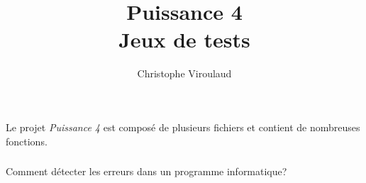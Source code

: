 \documentclass[svgnames,11pt]{beamer}
\author[]{Christophe Viroulaud}
\title{Puissance 4\\Jeux de tests}
\date{\framebox{\textbf{Lang 09}}}
\institute{Première - NSI}
\begin{document}
\begin{frame}
    \titlepage
\end{frame}
\begin{frame}
    \frametitle{}

    \begin{center}
        Le projet \emph{Puissance 4} est composé de plusieurs fichiers et contient de nombreuses fonctions.
    \end{center}

\end{frame}
\begin{frame}
    \frametitle{}

    \begin{framed}
        \centering Comment détecter les erreurs dans un programme informatique?
    \end{framed}

\end{frame}
\end{document}
